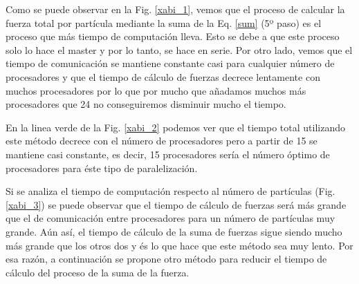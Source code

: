 \documentclass[onecolumn]{article}
\begin{document}
Como se puede observar en la Fig. \ref{xabi_1}, vemos que el proceso de calcular la fuerza total por partícula mediante la suma de la Eq. \ref{sum} (5º paso) es el proceso que más tiempo de computación lleva. Esto se debe a que este proceso solo lo hace el master y por lo tanto, se hace en serie. Por otro lado, vemos que el tiempo de comunicación se mantiene constante casi para cualquier número de procesadores y que el tiempo de cálculo de fuerzas decrece lentamente con muchos procesadores por lo que por mucho que añadamos muchos más procesadores que 24 no conseguiremos disminuir mucho el tiempo.

En la linea verde de la Fig. \ref{xabi_2} podemos ver que el tiempo total utilizando este método decrece con el número de procesadores pero a partir de 15 se mantiene casi constante, es decir, 15 procesadores sería el número óptimo de procesadores para éste tipo de paralelización.


Si se analiza el tiempo de computación respecto al número de partículas (Fig. \ref{xabi_3}) se puede observar que el tiempo de cálculo de fuerzas será más grande que el de comunicación entre procesadores para un número de partículas muy grande. Aún así, el tiempo de cálculo de la suma de fuerzas sigue siendo mucho más grande que los otros dos y és lo que hace que este método sea muy lento. Por esa razón, a continuación se propone otro método para reducir el tiempo de cálculo del proceso de la suma de la fuerza.
\end{document}
